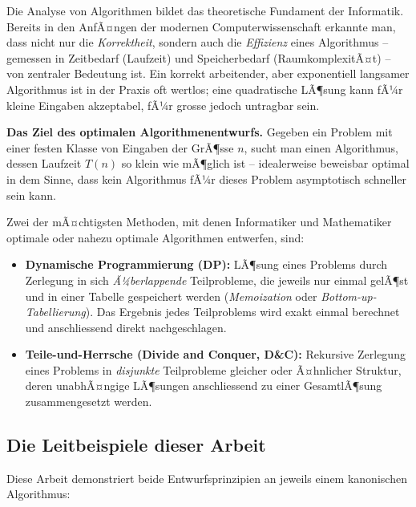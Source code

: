 ﻿\documentclass[a4paper,12pt]{article}
\theoremstyle{definition}
\begin{document}
Die Analyse von Algorithmen bildet das theoretische Fundament der Informatik. Bereits
in den AnfÃ¤ngen der modernen Computerwissenschaft erkannte man, dass nicht nur die
\emph{Korrektheit}, sondern auch die \emph{Effizienz} eines Algorithmus -- gemessen
in Zeitbedarf (Laufzeit) und Speicherbedarf (RaumkomplexitÃ¤t) -- von zentraler
Bedeutung ist. Ein korrekt arbeitender, aber exponentiell langsamer Algorithmus ist
in der Praxis oft wertlos; eine quadratische LÃ¶sung kann fÃ¼r kleine Eingaben
akzeptabel, fÃ¼r grosse jedoch untragbar sein.

\textbf{Das Ziel des optimalen Algorithmenentwurfs.}
Gegeben ein Problem mit einer festen Klasse von Eingaben der GrÃ¶sse $n$, sucht man
einen Algorithmus, dessen Laufzeit $T(n)$ so klein wie mÃ¶glich ist -- idealerweise
beweisbar optimal in dem Sinne, dass kein Algorithmus fÃ¼r dieses Problem
asymptotisch schneller sein kann.

Zwei der mÃ¤chtigsten Methoden, mit denen Informatiker und Mathematiker optimale
oder nahezu optimale Algorithmen entwerfen, sind:
\begin{itemize}
    \item \textbf{Dynamische Programmierung (DP):} LÃ¶sung eines Problems durch
          Zerlegung in sich \emph{Ã¼berlappende} Teilprobleme, die jeweils nur
          einmal gelÃ¶st und in einer Tabelle gespeichert werden
          (\textit{Memoization} oder \textit{Bottom-up-Tabellierung}).
          Das Ergebnis jedes Teilproblems wird exakt einmal berechnet und
          anschliessend direkt nachgeschlagen.
    \item \textbf{Teile-und-Herrsche (Divide and Conquer, D\&C):}
          Rekursive Zerlegung eines Problems in \emph{disjunkte} Teilprobleme
          gleicher oder Ã¤hnlicher Struktur, deren unabhÃ¤ngige LÃ¶sungen anschliessend
          zu einer GesamtlÃ¶sung zusammengesetzt werden.
\end{itemize}

\subsection{Die Leitbeispiele dieser Arbeit}

Diese Arbeit demonstriert beide Entwurfsprinzipien an jeweils einem kanonischen
Algorithmus:
\end{document}
